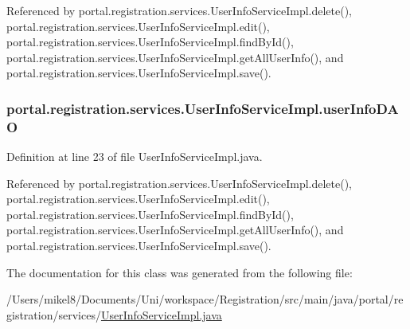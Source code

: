 Referenced by portal.registration.services.UserInfoServiceImpl.delete(), portal.registration.services.UserInfoServiceImpl.edit(), portal.registration.services.UserInfoServiceImpl.findById(), portal.registration.services.UserInfoServiceImpl.getAllUserInfo(), and portal.registration.services.UserInfoServiceImpl.save().

\hypertarget{classportal_1_1registration_1_1services_1_1UserInfoServiceImpl_a9c988cdd98ea519da82c1b69776590b0}{
\subsubsection[{userInfoDAO}]{ {\bf portal.registration.services.UserInfoServiceImpl.userInfoDAO}}}
\label{classportal_1_1registration_1_1services_1_1UserInfoServiceImpl_a9c988cdd98ea519da82c1b69776590b0}


Definition at line 23 of file UserInfoServiceImpl.java.



Referenced by portal.registration.services.UserInfoServiceImpl.delete(), portal.registration.services.UserInfoServiceImpl.edit(), portal.registration.services.UserInfoServiceImpl.findById(), portal.registration.services.UserInfoServiceImpl.getAllUserInfo(), and portal.registration.services.UserInfoServiceImpl.save().



The documentation for this class was generated from the following file:\begin{DoxyCompactItemize}
\item 
/Users/mikel8/Documents/Uni/workspace/Registration/src/main/java/portal/registration/services/\hyperlink{UserInfoServiceImpl_8java}{UserInfoServiceImpl.java}\end{DoxyCompactItemize}
